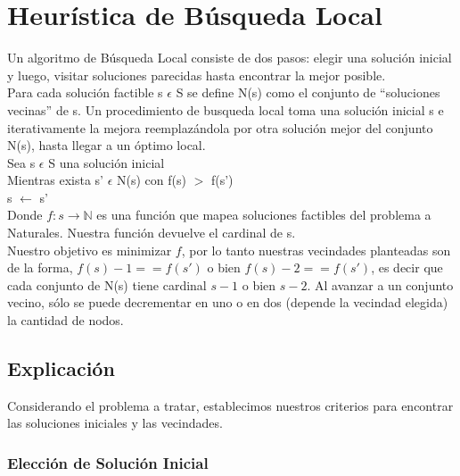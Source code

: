 \section{Heur\'istica de B\'usqueda Local} \label{ej4}
Un algoritmo de Búsqueda Local consiste de dos pasos: elegir una solución inicial y luego, visitar soluciones parecidas hasta encontrar la mejor posible.\\

Para cada solución factible s $\epsilon$ S se define N(s) como el conjunto de
``soluciones vecinas'' de s. Un procedimiento de busqueda local toma una solución inicial s e iterativamente la mejora reemplazándola por otra solución mejor del conjunto N(s), hasta llegar a un óptimo local.\\

Sea s $\epsilon$ S una solución inicial\\
 
Mientras exista s' $\epsilon$ N(s) con f(s) $>$ f(s')\\
 
s $\leftarrow$ s'\\

Donde $f: s \rightarrow \mathbb{N}$ es una funci\'on que mapea soluciones factibles del problema a Naturales. Nuestra funci\'on devuelve el cardinal de s.\\

Nuestro objetivo es minimizar $f$, por lo tanto nuestras vecindades planteadas son de la forma, $f(s) - 1 == f(s')$ o bien $f(s) - 2 == f(s')$, es decir que cada conjunto de N(s) tiene cardinal $s - 1$ o bien $s - 2$. Al avanzar a un conjunto vecino, s\'olo se puede decrementar en uno o en dos (depende la vecindad elegida) la cantidad de nodos.

\subsection{Explicaci\'on}

Considerando el problema a tratar, establecimos nuestros criterios para encontrar las soluciones iniciales y las vecindades.


\subsubsection{Elección de Solución Inicial}

